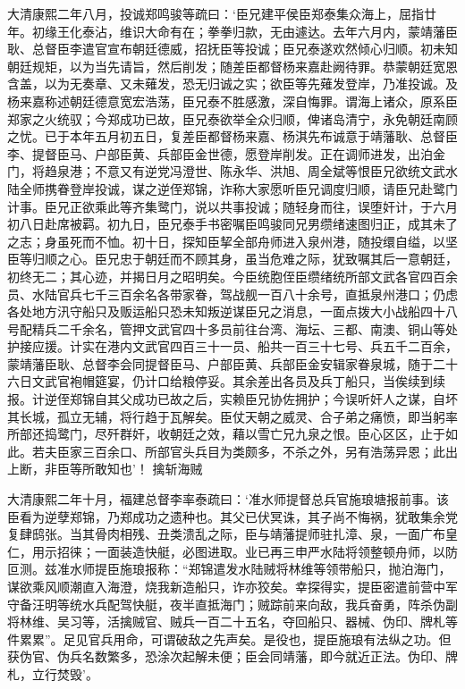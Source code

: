 \documentclass[]{article}
\begin{document}
大清康熙二年八月，投诚郑鸣骏等疏曰：`臣兄建平侯臣郑泰集众海上，屈指廿年。初缘王化泰沾，维识大命有在；拳拳归款，无由遽达。去年六月内，蒙靖藩臣耿、总督臣李遣官宣布朝廷德威，招抚臣等投诚；臣兄泰遂欢然倾心归顺。初未知朝廷规矩，以为当先请旨，然后削发；随差臣都督杨来嘉赴阙待罪。恭蒙朝廷宽恩含盖，以为无奏章、又未薙发，恐无归诚之实；欲臣等先薙发登岸，乃准投诚。及杨来嘉称述朝廷德意宽宏浩荡，臣兄泰不胜感激，深自悔罪。谓海上诸众，原系臣郑家之火统驭；今郑成功已故，臣兄泰欲举全众归顺，俾诸岛清宁，永免朝廷南顾之忧。已于本年五月初五日，复差臣都督杨来嘉、杨淇先布诚意于靖藩耿、总督臣李、提督臣马、户部臣黄、兵部臣金世德，愿登岸削发。正在调师进发，出泊金门，将趋泉港；不意又有逆党冯澄世、陈永华、洪旭、周全斌等恨臣兄欲统文武水陆全师携眷登岸投诚，谋之逆侄郑锦，诈称大家愿听臣兄调度归顺，请臣兄赴鹭门计事。臣兄正欲乘此等齐集鹭门，说以共事投诚；随轻身而往，误堕奸计，于六月初八日赴席被羁。初九日，臣兄泰手书密嘱臣鸣骏同兄男缵绪速图归正，成其未了之志；身虽死而不恤。初十日，探知臣挈全部舟师进入泉州港，随投缳自缢，以坚臣等归顺之心。臣兄忠于朝廷而不顾其身，虽当危难之际，犹致嘱其后一意朝廷，初终无二；其心迹，并揭日月之昭明矣。今臣统胞侄臣缵绪统所部文武各官四百余员、水陆官兵七千三百余名各带家眷，驾战舰一百八十余号，直抵泉州港口；仍虑各处地方汛守船只及贩运船只恐未知叛逆谋臣兄之消息，一面点拨大小战船四十八号配精兵二千余名，管押文武官四十多员前往台湾、海坛、三都、南澳、铜山等处护接应援。计实在港内文武官四百三十一员、船共一百三十七号、兵五千二百余，蒙靖藩臣耿、总督李会同提督臣马、户部臣黄、兵部臣金安辑家眷泉城，随于二十六日文武官袍帽筵宴，仍计口给粮停妥。其余差出各员及兵丁船只，当俟续到续报。计逆侄郑锦自其父成功已故之后，实赖臣兄协佐拥护；今误听奸人之谋，自坏其长城，孤立无辅，将行趋于瓦解矣。臣仗天朝之威灵、合子弟之痛愤，即当躬率所部还捣鹭门，尽歼群奸，收朝廷之效，藉以雪亡兄九泉之恨。臣心区区，止于如此。若夫臣家三百余口、所部官头兵目为类颇多，不杀之外，另有浩荡异恩；此出上断，非臣等所敢知也'！
擒斩海贼

大清康熙二年十月，福建总督李率泰疏曰：`准水师提督总兵官施琅塘报前事。该臣看为逆孽郑锦，乃郑成功之遗种也。其父已伏冥诛，其子尚不悔祸，犹敢集余党复肆鸱张。当其骨肉相残、丑类溃乱之际，臣与靖藩提师驻扎漳、泉，一面广布皇仁，用示招徕；一面装造快艇，必图进取。业已再三申严水陆将领整顿舟师，以防叵测。兹准水师提臣施琅报称：``郑锦遣发水陆贼将林维等领带船只，抛泊海门，谋欲乘风顺潮直入海澄，烧我新造船只，诈亦狡矣。幸探得实，提臣密遣前营中军守备汪明等统水兵配驾快艇，夜半直抵海门；贼踪前来向敌，我兵奋勇，阵杀伪副将林维、吴习等，活擒贼官、贼兵一百二十五名，夺回船只、器械、伪印、牌札等件累累''。足见官兵用命，可谓破敌之先声矣。是役也，提臣施琅有法纵之功。但获伪官、伪兵名数繁多，恐涂次起解未便；臣会同靖藩，即今就近正法。伪印、牌札，立行焚毁'。
\end{document}

